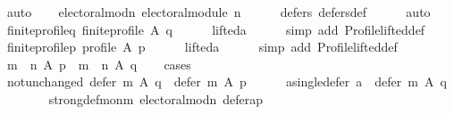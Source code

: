 \begin{isabellebody}
\ auto\isanewline
\ \ \isamarkupfalse%
\ electoral{\isacharunderscore}{\kern0pt}mod{\isacharunderscore}{\kern0pt}n{\isacharcolon}{\kern0pt}\ {\isachardoublequoteopen}electoral{\isacharunderscore}{\kern0pt}module\ n{\isachardoublequoteclose}\isanewline
\ \ \ \ \isamarkupfalse%
\ defers{\isacharunderscore}{\kern0pt}{}\ defers{\isacharunderscore}{\kern0pt}def\isanewline
\ \ \ \ \isamarkupfalse%
\ auto\isanewline
\ \ \isamarkupfalse%
\ finite{\isacharunderscore}{\kern0pt}profile{\isacharunderscore}{\kern0pt}q{\isacharcolon}{\kern0pt}\ {\isachardoublequoteopen}finite{\isacharunderscore}{\kern0pt}profile\ A\ q{\isachardoublequoteclose}\isanewline
\ \ \ \ \isamarkupfalse%
\ lifted{\isacharunderscore}{\kern0pt}a\isanewline
\ \ \ \ \isamarkupfalse%
\ {\isacharparenleft}{\kern0pt}simp\ add{\isacharcolon}{\kern0pt}\ Profile{\isachardot}{\kern0pt}lifted{\isacharunderscore}{\kern0pt}def{\isacharparenright}{\kern0pt}\isanewline
\ \ \isamarkupfalse%
\ finite{\isacharunderscore}{\kern0pt}profile{\isacharunderscore}{\kern0pt}p{\isacharcolon}{\kern0pt}\ {\isachardoublequoteopen}profile\ A\ p{\isachardoublequoteclose}\isanewline
\ \ \ \ \isamarkupfalse%
\ lifted{\isacharunderscore}{\kern0pt}a\isanewline
\ \ \ \ \isamarkupfalse%
\ {\isacharparenleft}{\kern0pt}simp\ add{\isacharcolon}{\kern0pt}\ Profile{\isachardot}{\kern0pt}lifted{\isacharunderscore}{\kern0pt}def{\isacharparenright}{\kern0pt}\isanewline
\ \ \isamarkupfalse%
\ {\isachardoublequoteopen}{\isacharparenleft}{\kern0pt}m\ {\isasymtriangleright}\ n{\isacharparenright}{\kern0pt}\ A\ p\ {\isacharequal}{\kern0pt}\ {\isacharparenleft}{\kern0pt}m\ {\isasymtriangleright}\ n{\isacharparenright}{\kern0pt}\ A\ q{\isachardoublequoteclose}\isanewline
\ \ \isamarkupfalse%
\ cases\isanewline
\ \ \ \ \isamarkupfalse%
\ not{\isacharunderscore}{\kern0pt}unchanged{\isacharcolon}{\kern0pt}\ {\isachardoublequoteopen}defer\ m\ A\ q\ {\isasymnoteq}\ defer\ m\ A\ p{\isachardoublequoteclose}\isanewline
\ \ \ \ \isamarkupfalse%
\ a{\isacharunderscore}{\kern0pt}single{\isacharunderscore}{\kern0pt}defer{\isacharcolon}{\kern0pt}\ {\isachardoublequoteopen}{\isacharbraceleft}{\kern0pt}a{\isacharbraceright}{\kern0pt}\ {\isacharequal}{\kern0pt}\ defer\ m\ A\ q{\isachardoublequoteclose}\isanewline
\ \ \ \ \ \ \isamarkupfalse%
\ strong{\isacharunderscore}{\kern0pt}def{\isacharunderscore}{\kern0pt}mon{\isacharunderscore}{\kern0pt}m\ electoral{\isacharunderscore}{\kern0pt}mod{\isacharunderscore}{\kern0pt}n\ defer{\isacharunderscore}{\kern0pt}a{\isacharunderscore}{\kern0pt}p\isanewline

\end{isabellebody}
